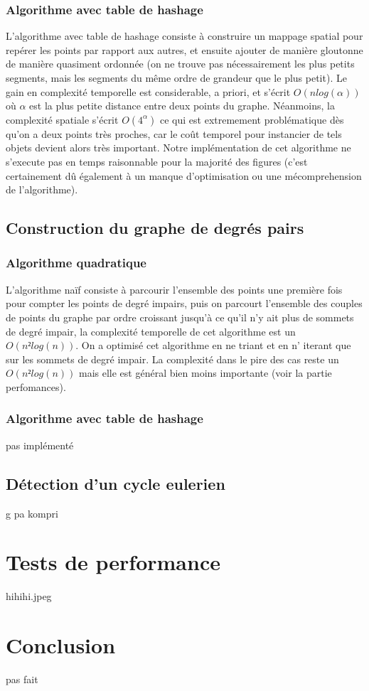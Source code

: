 \documentclass[a4paper,11pt]{article}
\begin{document}
\subsubsection{Algorithme avec table de hashage}

L'algorithme avec table de hashage consiste à construire un mappage spatial pour repérer les points par rapport
aux autres, et ensuite ajouter de manière gloutonne de manière quasiment ordonnée (on ne trouve pas nécessairement
les plus petits segments, mais les segments du même ordre de grandeur que le plus petit). Le gain en complexité temporelle
est considerable, a priori, et s'écrit $O(nlog(\alpha))$ où $\alpha$ est la plus petite distance entre deux points du graphe.
Néanmoins, la complexité spatiale s'écrit $O(4^{\alpha})$ ce qui est extremement problématique dès qu'on a deux points très proches,
car le coût temporel pour instancier de tels objets devient alors très important.
Notre implémentation de cet algorithme ne s'execute pas en temps raisonnable pour la majorité des figures (c'est certainement dû
également à un manque d'optimisation ou une mécomprehension de l'algorithme).
\subsection{Construction du graphe de degrés pairs}

\subsubsection{Algorithme quadratique}

L'algorithme naïf consiste à parcourir l'ensemble des points une première fois pour compter les points de degré impairs,
puis on parcourt l'ensemble des couples de points du graphe par ordre croissant jusqu'à ce qu'il n'y ait plus de sommets de
degré impair, la complexité temporelle de cet algorithme est un $O(n²log(n))$. On a optimisé cet algorithme en ne triant et en n'
iterant que sur les sommets de degré impair. La complexité dans le pire des cas reste un $O(n²log(n))$ mais elle est général bien
moins importante (voir la partie perfomances).

\subsubsection{Algorithme avec table de hashage}

pas implémenté

\subsection{Détection d'un cycle eulerien}

g pa kompri

\section{Tests de performance}

hihihi.jpeg

\section{Conclusion}

pas fait
\end{document}
